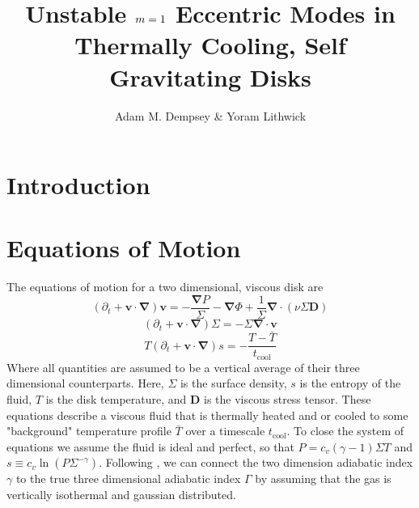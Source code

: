 \documentclass[apj]{emulateapj}
\begin{document}
\title{Unstable $\MakeLowercase{m} = 1$ Eccentric Modes in Thermally Cooling, Self Gravitating Disks}
\author{Adam M. Dempsey \& Yoram Lithwick}


\begin{abstract}


\end{abstract}


\section{Introduction}

\section{Equations of Motion}
The equations of motion for a two dimensional, viscous disk are
\begin{equation}
(\partial_t + \mathbf{v} \cdot \mathbf{\nabla}) \mathbf{v} = - \frac{ \mathbf{\nabla} P}{\Sigma} - \mathbf{\nabla}\Phi + \frac{1}{\Sigma} \mathbf{\nabla} \cdot ( \nu \Sigma \mathbf{D} )
\end{equation}
\begin{equation}
(\partial_t + \mathbf{v} \cdot \mathbf{\nabla}) \Sigma = - \Sigma \mathbf{\nabla} \cdot \mathbf{v}
\end{equation}
\begin{equation}
T (\partial_t + \mathbf{v} \cdot \mathbf{\nabla} ) s = - \frac{ T - \bar{T}}{t_\text{cool}}
\end{equation}
Where all quantities are assumed to be a vertical average of their three dimensional counterparts. Here, $\Sigma$ is the surface density, $s$ is the entropy of the fluid, $T$ is the disk temperature, and $\mathbf{D}$ is the viscous stress tensor. These equations describe a viscous fluid that is thermally heated and or cooled to some "background" temperature profile $\bar{T}$ over a timescale $t_\text{cool}$. To close the system of equations we assume the fluid is ideal and perfect, so that $P =  c_v (\gamma -1 ) \Sigma T $ and $s \equiv c_v \ln \left( P \Sigma^{-\gamma} \right)$. Following \citet{osa92}, we can connect the two dimension adiabatic index $\gamma$ to the true three dimensional adiabatic index $\Gamma$ by assuming that the gas is vertically isothermal and gaussian distributed. 
\end{document}
